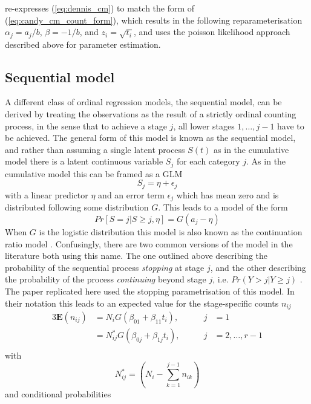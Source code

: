 \citet{candy1991modeling} re-expresses (\ref{eq:dennis_cm}) to match the form of (\ref{eq:candy_cm_count_form}), which results in the following re\-para\-meter\-isation $\alpha_j = a_j/b$, $\beta = -1/b$, and $z_i = \sqrt{t_i}$, and uses the poisson likelihood approach described above for parameter estimation. 

\subsection{Sequential model}
A different class of ordinal regression models, the sequential model, can be derived by treating the observations as the result of a strictly ordinal counting process, in the sense that to achieve a stage $j$, all lower stages $1,\dots,j-1$ have to be achieved. The general form of this model is known as the sequential model, and rather than assuming a single latent process $S(t)$ as in the cumulative model there is a latent continuous variable $S_j$ for each category $j$. As in the cumulative model this can be framed as a GLM 
\begin{equation}
S_j = \eta + \epsilon_j
\end{equation}
with a linear predictor $\eta$ and an error term $\epsilon_j$ which has mean zero and is distributed following some distribution $G$. This leads to a model of the form 
\begin{equation}
Pr[S = j|S \geq j, \eta] = G(a_j - \eta)
\end{equation}
When $G$ is the logistic distribution this model is also known as the continuation ratio model \citep{fienberg1980analysis}. Confusingly, there are two common versions of the model in the literature both using this name. The one outlined above describing the probability of the sequential process \emph{stopping} at stage $j$, and the other describing the probability of the process \emph{continuing} beyond stage $j$, i.e. $Pr(Y > j | Y \geq j)$ \citep{burkner2019ordinal,VGAM}. The paper replicated here \citep{candy1991modeling}  used the stopping parametrisation of this model.
In their notation this leads to an expected value for the stage-specific counts $n_{ij}$
\begin{alignat}{3}
\mathbf{E}(n_{ij})&=N_i G(\beta_{01} + \beta_{11}t_i), &j&=1\\
&=N^*_{ij} G(\beta_{0j} + \beta_{1j}t_i), \qquad &j&=2,\dots,r-1\\
\end{alignat}
with 
$$N^*_{ij}=\left(N_i - \sum_{k=1}^{j-1}n_{ik}\right) $$
and conditional probabilities 

